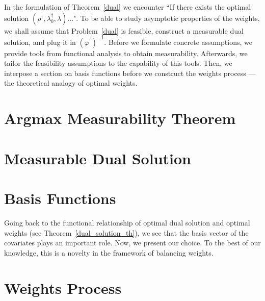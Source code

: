 In the formulation of Theorem~\ref{dual} we encounter “If there exists the optimal solution $(\rho^\dagger,\lambda_0^\dagger,\lambda)$...".
To be able to study asymptotic properties of the weights, we 
shall assume that Problem~\ref{dual} is feasible,
construct a measurable dual solution, and plug it in $(\varphi^{'})^{-1}$.
Before we formulate concrete assumptions, we provide tools from functional analysis
to obtain measurability. Afterwards, we tailor the feasibility assumptions to the capability of this tools.
Then, we interpose a section on basis functions before we construct the weights process --- the theoretical analogy of optimal weights.
\section{Argmax Measurability Theorem}
  
\section{Measurable Dual Solution}
  
\section{Basis Functions}
\label{sec:basis}
Going back to the functional relationship of optimal dual solution and optimal weights (see Theorem~\ref{dual_solution_th}), we see
that the basis vector of the covariates
plays an important role.
%
Now, we present our choice.
%
To the best of our knowledge, this is a novelty in the framework of balancing weights.

  
\section{Weights Process}
  
